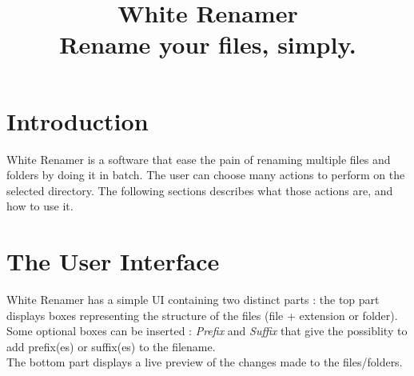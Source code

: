 \documentclass[11pt, a4paper]{scrartcl}
\title{\color{white}\Huge\textsf{White Renamer}\\[1.5cm]
\large\textsf{Rename your files, simply.}}
\date{}
\author{}
\newcommand{\HRule}[1]{\rule{\linewidth}{#1}} 	%
\begin{document}
\setlength{\parindent}{0pt}
\restoregeometry %
\nopagecolor%
\renewcommand{\labelitemi}{$\bullet$}
\section{Introduction}
White Renamer is a software that ease the pain of renaming multiple files and folders by doing it in batch. The user can choose many actions to perform on the selected directory. The following sections describes what those actions are, and how to use it.

\section{The User Interface}
White Renamer has a simple UI containing two distinct parts : the top part displays boxes representing the structure of the files (file + extension or folder). \\
Some optional boxes can be inserted : \emph{Prefix} and \emph{Suffix} that give the possiblity to add prefix(es) or suffix(es) to the filename.\\
The bottom part displays a live preview of the changes made to the files/folders.
\end{document}
